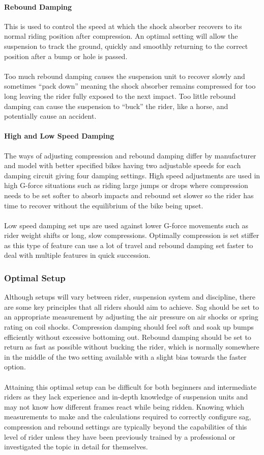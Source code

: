 	\paragraph{Rebound Damping}
		This is used to control the speed at which the shock absorber recovers to its normal riding position after compression. An optimal setting will allow the suspension to track the ground, quickly and smoothly returning to the correct position after a bump or hole is passed. 
		\\\\
		Too much rebound damping causes the suspension unit to recover slowly and sometimes “pack down” meaning the shock absorber remains compressed for too long leaving the rider fully exposed to the next impact. Too little rebound damping can cause the suspension to “buck” the rider, like a horse, and potentially cause an accident.
	\paragraph{High and Low Speed Damping} 
		The ways of adjusting compression and rebound damping differ by manufacturer and model with better specified bikes having two adjustable speeds for each damping circuit giving four damping settings. High speed adjustments are used in high G-force situations such as riding large jumps or drops where compression needs to be set softer to absorb impacts and rebound set slower so the rider has time to recover without the equilibrium of the bike being upset.
		\\\\
		Low speed damping set ups are used against lower G-force movements such as rider weight shifts or long, slow compressions. Optimally compression is set stiffer as this type of feature can use a lot of travel and rebound damping set faster to deal with multiple features in quick succession.
	\subsubsection{Optimal Setup}
		Although setups will vary between rider, suspension system and discipline, there are some key principles that all riders should aim to achieve. Sag should be set to an appropriate measurement by adjusting the air pressure on air shocks or spring rating on coil shocks. Compression damping should feel soft and soak up bumps efficiently without excessive bottoming out. Rebound damping should be set to return as fast as possible without bucking the rider, which is normally somewhere in the middle of the two setting available with a slight bias towards the faster option.
		\\\\
		Attaining this optimal setup can be difficult for both beginners and intermediate riders as they lack experience and in-depth knowledge of suspension units and may not know how different frames react while being ridden. Knowing which measurements to make and the calculations required to correctly configure sag, compression and rebound settings are typically beyond the capabilities of this level of rider unless they have been previously trained by a professional or investigated the topic in detail for themselves.